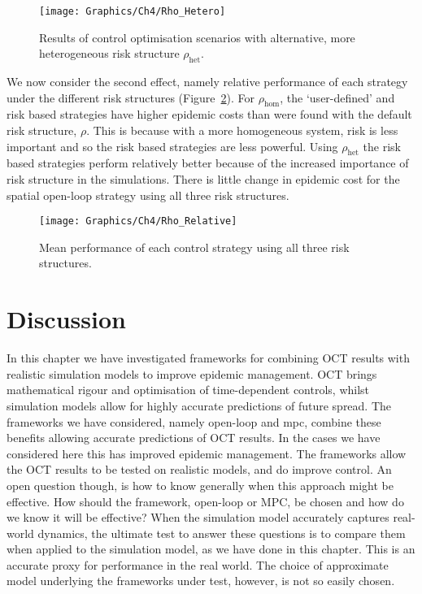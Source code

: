 \begin{figure}[h]
    \begin{center}
        \texttt{[image: Graphics/Ch4/Rho\_Hetero]}
        \caption{Results of control optimisation scenarios with alternative, more heterogeneous risk structure $\rho_{\mathrm{het}}$.}
        \label{fig:ch4:rho_hetero}
    \end{center}
\end{figure}

We now consider the second effect, namely relative performance of each strategy under the different risk structures (Figure~\ref{fig:ch4:rho_relative}). For $\rho_{\mathrm{hom}}$, the `user-defined' and risk based strategies have higher epidemic costs than were found with the default risk structure, $\rho$. This is because with a more homogeneous system, risk is less important and so the risk based strategies are less powerful. Using $\rho_{\mathrm{het}}$ the risk based strategies perform relatively better because of the increased importance of risk structure in the simulations. There is little change in epidemic cost for the spatial open-loop strategy using all three risk structures.

\begin{figure}[h]
    \begin{center}
        \texttt{[image: Graphics/Ch4/Rho\_Relative]}
        \caption{Mean performance of each control strategy using all three risk structures.}
        \label{fig:ch4:rho_relative}
    \end{center}
\end{figure}

\FloatBarrier

\section{Discussion\label{sec:ch4:Discussion}}

In this chapter we have investigated frameworks for combining OCT results with realistic simulation models to improve epidemic management. OCT brings mathematical rigour and optimisation of time-dependent controls, whilst simulation models allow for highly accurate predictions of future spread. The frameworks we have considered, namely open-loop and mpc, combine these benefits allowing accurate predictions of OCT results. In the cases we have considered here this has improved epidemic management. The frameworks allow the OCT results to be tested on realistic models, and do improve control. An open question though, is how to know generally when this approach might be effective. How should the framework, open-loop or MPC, be chosen and how do we know it will be effective? When the simulation model accurately captures real-world dynamics, the ultimate test to answer these questions is to compare them when applied to the simulation model, as we have done in this chapter. This is an accurate proxy for performance in the real world. The choice of approximate model underlying the frameworks under test, however, is not so easily chosen.

